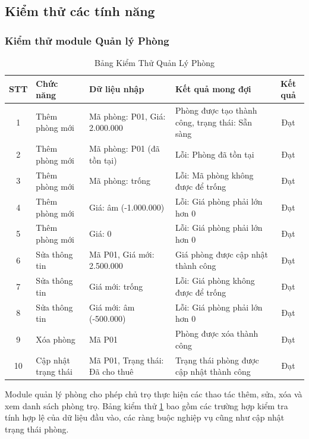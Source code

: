 \subsection{Kiểm thử các tính năng}
\subsubsection{Kiểm thử module Quản lý Phòng}

\begin{table}[H]
    \centering
    \caption{Bảng Kiểm Thử Quản Lý Phòng}
    \label{tab:room_management_test}
    \vspace{2mm}
    \begin{small} 
    \begin{tabularx}{\textwidth}{|c|l|X|X|c|} 
    \hline
    \textbf{STT} & \textbf{Chức năng} & \textbf{Dữ liệu nhập} & \textbf{Kết quả mong đợi} & \textbf{Kết quả} \\ \hline
    1 & Thêm phòng mới & Mã phòng: P01, Giá: 2.000.000 & Phòng được tạo thành công, trạng thái: Sẵn sàng & Đạt \\ \hline
    2 & Thêm phòng mới & Mã phòng: P01 (đã tồn tại) & Lỗi: Phòng đã tồn tại & Đạt \\ \hline
    3 & Thêm phòng mới & Mã phòng: trống & Lỗi: Mã phòng không được để trống & Đạt \\ \hline
    4 & Thêm phòng mới & Giá: âm (-1.000.000) & Lỗi: Giá phòng phải lớn hơn 0 & Đạt \\ \hline
    5 & Thêm phòng mới & Giá: 0 & Lỗi: Giá phòng phải lớn hơn 0 & Đạt \\ \hline
    6 & Sửa thông tin & Mã P01, Giá mới: 2.500.000 & Giá phòng được cập nhật thành công & Đạt \\ \hline
    7 & Sửa thông tin & Giá mới: trống & Lỗi: Giá phòng không được để trống & Đạt \\ \hline
    8 & Sửa thông tin & Giá mới: âm (-500.000) & Lỗi: Giá phòng phải lớn hơn 0 & Đạt \\ \hline
    9 & Xóa phòng & Mã P01 & Phòng được xóa thành công & Đạt \\ \hline
    10 & Cập nhật trạng thái & Mã P01, Trạng thái: Đã cho thuê & Trạng thái phòng được cập nhật thành công & Đạt \\ \hline
        \end{tabularx}
    \end{small}
\end{table}

Module quản lý phòng cho phép chủ trọ thực hiện các thao tác thêm, sửa, xóa và xem danh sách phòng trọ. Bảng kiểm thử \ref{tab:room_management_test} bao gồm các trường hợp kiểm tra tính hợp lệ của dữ liệu đầu vào, các ràng buộc nghiệp vụ cũng như cập nhật trạng thái phòng.

